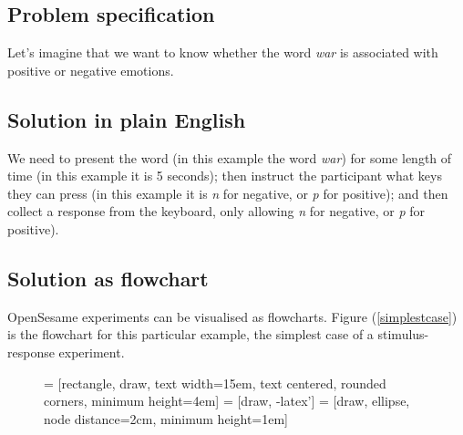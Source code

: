 \documentclass[a4paper]{tufte-handout}
\begin{document}
\subsection{Problem specification}
Let's imagine that we want to know whether the word \emph{war} is associated with positive or negative emotions.

\subsection{Solution in plain English}
We need to present the word (in this example the word \emph{war}) for some length of time (in this example it is 5 seconds); then instruct the participant what keys they can press (in this example it is \emph{n} for negative, or \emph{p} for positive); and then collect a response from the keyboard, only allowing \emph{n} for negative, or \emph{p} for positive).

\subsection{Solution as flowchart}
OpenSesame experiments can be visualised as flowcharts. Figure (\ref{simplestcase}) is the flowchart for this particular example, the simplest case of a stimulus-response experiment.
\begin{figure}[hbtp]
\centering
{} = [rectangle, draw, text width=15em, text centered, rounded corners, minimum height=4em]
 = [draw, -latex']
 = [draw, ellipse, node distance=2cm, minimum height=1em]
\end{figure}

\end{document}
